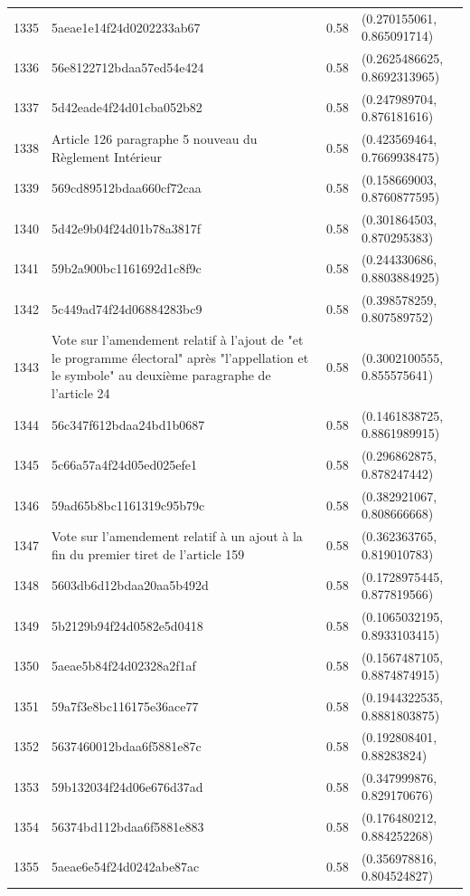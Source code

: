 \begin{table}[ht]
\begin{tabular}{rlrl}
  1335 & 5aeae1e14f24d0202233ab67 & 0.58 & (0.270155061, 0.865091714) \\ 
  1336 & 56e8122712bdaa57ed54e424 & 0.58 & (0.2625486625, 0.8692313965) \\ 
  1337 & 5d42eade4f24d01cba052b82 & 0.58 & (0.247989704, 0.876181616) \\ 
  1338 & Article 126 paragraphe 5 nouveau du Règlement Intérieur & 0.58 & (0.423569464, 0.7669938475) \\ 
  1339 & 569cd89512bdaa660cf72caa & 0.58 & (0.158669003, 0.8760877595) \\ 
  1340 & 5d42e9b04f24d01b78a3817f & 0.58 & (0.301864503, 0.870295383) \\ 
  1341 & 59b2a900bc1161692d1c8f9c & 0.58 & (0.244330686, 0.8803884925) \\ 
  1342 & 5c449ad74f24d06884283bc9 & 0.58 & (0.398578259, 0.807589752) \\ 
  1343 & Vote sur l'amendement relatif à l'ajout de "et le programme électoral" après "l'appellation et le symbole" au deuxième paragraphe de l'article 24 & 0.58 & (0.3002100555, 0.855575641) \\ 
  1344 & 56c347f612bdaa24bd1b0687 & 0.58 & (0.1461838725, 0.8861989915) \\ 
  1345 & 5c66a57a4f24d05ed025efe1 & 0.58 & (0.296862875, 0.878247442) \\ 
  1346 & 59ad65b8bc1161319c95b79c & 0.58 & (0.382921067, 0.808666668) \\ 
  1347 & Vote sur l'amendement relatif à un ajout à la fin du premier tiret de l'article 159 & 0.58 & (0.362363765, 0.819010783) \\ 
  1348 & 5603db6d12bdaa20aa5b492d & 0.58 & (0.1728975445, 0.877819566) \\ 
  1349 & 5b2129b94f24d0582e5d0418 & 0.58 & (0.1065032195, 0.8933103415) \\ 
  1350 & 5aeae5b84f24d02328a2f1af & 0.58 & (0.1567487105, 0.8874874915) \\ 
  1351 & 59a7f3e8bc116175e36ace77 & 0.58 & (0.1944322535, 0.8881803875) \\ 
  1352 & 5637460012bdaa6f5881e87c & 0.58 & (0.192808401, 0.88283824) \\ 
  1353 & 59b132034f24d06e676d37ad & 0.58 & (0.347999876, 0.829170676) \\ 
  1354 & 56374bd112bdaa6f5881e883 & 0.58 & (0.176480212, 0.884252268) \\ 
  1355 & 5aeae6e54f24d0242abe87ac & 0.58 & (0.356978816, 0.804524827) \\ 

\end{tabular}
\end{table}
